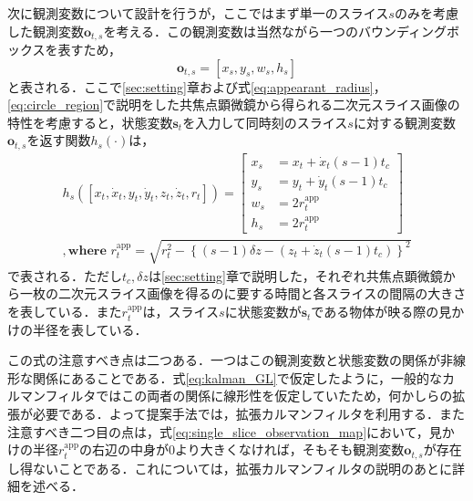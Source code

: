     次に観測変数について設計を行うが，ここではまず単一のスライス$s$のみを考慮した観測変数$\bm{o}_{t, s}$を考える．この観測変数は当然ながら一つのバウンディングボックスを表すため，
    \begin{equation}
        \label{eq:single_slice_observation}
        \bm{o}_{t, s} = \left[x_s, y_s, w_s, h_s\right]
    \end{equation}
    と表される．ここで\ref{sec:setting}章および式\ref{eq:appearant_radius}，\ref{eq:circle_region}で説明をした共焦点顕微鏡から得られる二次元スライス画像の特性を考慮すると，状態変数$\bm{s}_t$を入力して同時刻のスライス$s$に対する観測変数$\bm{o}_{t,s}$を返す関数$h_s(\cdot)$は，
    \begin{equation}
        \label{eq:single_slice_observation_map}
        \begin{gathered}
            h_s(\left[x_t, \dot{x}_t, y_t, \dot{y}_t, z_t, \dot{z}_t, r_t\right]) = \left[
                \begin{aligned}
                    x_s &= x_t + \dot{x}_t (s - 1) t_c
                    \\ y_s &= y_t + \dot{y}_t (s - 1) t_c
                    \\ w_s &= 2r_t^{\text{app}}
                    \\ h_s &= 2r_t^{\text{app}}
                \end{aligned}
                \right]
            \\  ,\textbf{where } r_t^{\text{app}} = \sqrt{r_t^2 - \left\{(s - 1)\delta z - \left(z_t + \dot{z}_t (s - 1) t_c\right) \right\}^2}
        \end{gathered}
    \end{equation}
    で表される．ただし$t_c, \delta z$は\ref{sec:setting}章で説明した，それぞれ共焦点顕微鏡から一枚の二次元スライス画像を得るのに要する時間と各スライスの間隔の大きさを表している．また$r_t^{\text{app}}$は，スライス$s$に状態変数が$\bm{s}_t$である物体が映る際の見かけの半径を表している．

    この式の注意すべき点は二つある．一つはこの観測変数と状態変数の関係が非線形な関係にあることである．式\ref{eq:kalman_GL}で仮定したように，一般的なカルマンフィルタではこの両者の関係に線形性を仮定していたため，何かしらの拡張が必要である．よって提案手法では，拡張カルマンフィルタ\cite{bishop2001introduction}を利用する．また注意すべき二つ目の点は，式\ref{eq:single_slice_observation_map}において，見かけの半径$r_t^{\text{app}}$の右辺の中身が$0$より大きくなければ，そもそも観測変数$\bm{o}_{t,s}$が存在し得ないことである．これについては，拡張カルマンフィルタの説明のあとに詳細を述べる．

